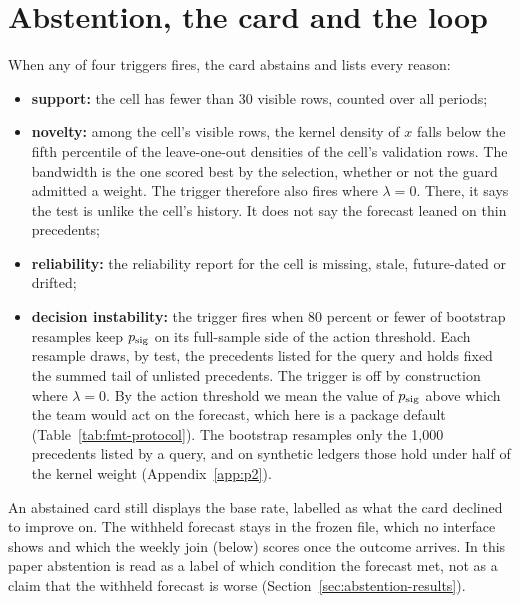 \section{Abstention, the card and the loop}
\label{sec:card-loop}
When any of four triggers fires, the card abstains and lists every reason:
\begin{itemize}
\item \textbf{support:} the cell has fewer than 30 visible rows, counted over all periods;
\item \textbf{novelty:} among the cell's visible rows, the kernel density of $x$ falls below the fifth percentile of the leave-one-out densities of the cell's validation rows. The bandwidth is the one scored best by the selection, whether or not the guard admitted a weight. The trigger therefore also fires where $\lambda = 0$. There, it says the test is unlike the cell's history. It does not say the forecast leaned on thin precedents;
\item \textbf{reliability:} the reliability report for the cell is missing, stale, future-dated or drifted;
\item \textbf{decision instability:} the trigger fires when 80 percent or fewer of bootstrap resamples keep $p_{\mathrm{sig}}$ on its full-sample side of the action threshold. Each resample draws, by test, the precedents listed for the query and holds fixed the summed tail of unlisted precedents. The trigger is off by construction where $\lambda = 0$. By the action threshold we mean the value of $p_{\mathrm{sig}}$ above which the team would act on the forecast, which here is a package default (Table~\ref{tab:fmt-protocol}). The bootstrap resamples only the 1,000 precedents listed by a query, and on synthetic ledgers those hold under half of the kernel weight (Appendix~\ref{app:p2}).
\end{itemize}
An abstained card still displays the base rate, labelled as what the card declined to improve on. The withheld forecast stays in the frozen file, which no interface shows and which the weekly join (below) scores once the outcome arrives. In this paper abstention is read as a label of which condition the forecast met, not as a claim that the withheld forecast is worse (Section~\ref{sec:abstention-results}).

